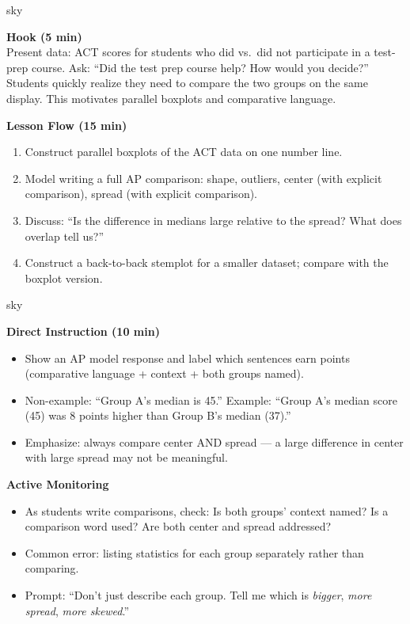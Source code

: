 \documentclass[10pt]{article}
\begin{document}
\boxguard
\begin{skillbox}{sky}
\begin{minipage}[t]{0.48\linewidth}
    \textbf{Hook (5 min)}\\
    Present data: ACT scores for students who did vs.\ did not participate in a test-prep course. Ask: ``Did the test prep course help? How would you decide?'' Students quickly realize they need to compare the two groups on the same display. This motivates parallel boxplots and comparative language.
\end{minipage}
\hfill
\begin{minipage}[t]{0.48\linewidth}
    \textbf{Lesson Flow (15 min)}
    \begin{enumerate}
        \item Construct parallel boxplots of the ACT data on one number line.
        \item Model writing a full AP comparison: shape, outliers, center (with explicit comparison), spread (with explicit comparison).
        \item Discuss: ``Is the difference in medians large relative to the spread? What does overlap tell us?''
        \item Construct a back-to-back stemplot for a smaller dataset; compare with the boxplot version.
    \end{enumerate}
\end{minipage}
\end{skillbox}

\boxguard
\begin{skillbox}{sky}
\begin{minipage}[t]{0.48\linewidth}
    \textbf{Direct Instruction (10 min)}
    \begin{itemize}
        \item Show an AP model response and label which sentences earn points (comparative language + context + both groups named).
        \item Non-example: ``Group A's median is 45.'' Example: ``Group A's median score (45) was 8 points higher than Group B's median (37).''
        \item Emphasize: always compare center AND spread --- a large difference in center with large spread may not be meaningful.
    \end{itemize}
\end{minipage}
\hfill
\begin{minipage}[t]{0.48\linewidth}
    \textbf{Active Monitoring}
    \begin{itemize}
        \item As students write comparisons, check: Is both groups' context named? Is a comparison word used? Are both center and spread addressed?
        \item Common error: listing statistics for each group separately rather than comparing.
        \item Prompt: ``Don't just describe each group. Tell me which is \textit{bigger}, \textit{more spread}, \textit{more skewed}.''
    \end{itemize}
\end{minipage}
\end{skillbox}
\end{document}
